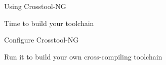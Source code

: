 \setuplabframe
{Using Crosstool-NG}
{
  Time to build your toolchain
  \startitemize
  \item Configure Crosstool-NG
  \item Run it to build your own cross-compiling toolchain
  \stopitemize
}
